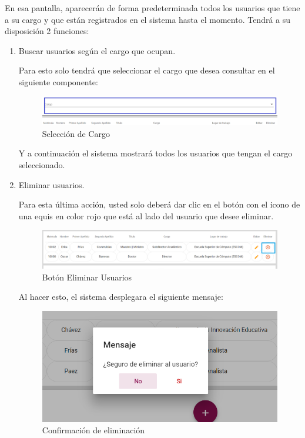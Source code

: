         En esa pantalla, aparecerán de forma predeterminada todos los usuarios que tiene a su cargo y que están registrados en el sistema hasta el momento. Tendrá a su disposición 2 funciones:
        \newpage
        \begin{enumerate}

            \item   Buscar usuarios según el cargo que ocupan.

                Para esto solo tendrá que seleccionar el cargo que desea consultar en el siguiente componente:

                \begin{figure}[!hbtp]
                    \centering
                    \hypertarget{cargo1}{\includegraphics[width=0.7\linewidth]{images/SP5/BtnCargo1}}
                    \caption{Selección de Cargo}
                    \label{cargo1}
                \end{figure}

                 Y a continuación el sistema mostrará todos los usuarios que tengan el cargo seleccionado.



            \item Eliminar usuarios.

                Para esta última acción, usted solo deberá dar clic en el botón con el icono de una equis en color rojo que está al lado del usuario que desee  eliminar.

                \begin{figure}[!hbtp]
                    \centering
                    \hypertarget{eliminar}{\includegraphics[width=0.7\linewidth]{images/SP5/BtnEliminar}}
                    \caption{Botón Eliminar Usuarios}
                    \label{eliminar}
                \end{figure}

                Al hacer esto, el sistema desplegara el siguiente mensaje:

               \begin{figure}[!hbtp]
                	\centering
                	\includegraphics[width=0.4\linewidth]{images/SP5/MSG22}
               	\caption{Confirmación de eliminación}
               	\label{confirmarE}


\end{figure}
\end{enumerate}
